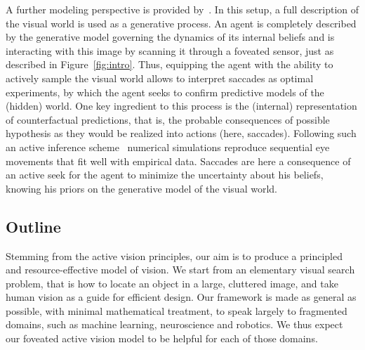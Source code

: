 A further modeling perspective is {\color{red} provided by~\cite{Friston12}}. In this setup, a full description of the visual world is used as a generative process. An agent is completely described by the generative model governing the dynamics of its internal beliefs and is interacting with this image by scanning it through a foveated sensor, just as described in Figure~\ref{fig:intro}. Thus, equipping the agent with the ability to actively sample the visual world %
allows to interpret saccades as optimal experiments, by which the agent seeks to confirm predictive models of the (hidden) world. One key ingredient to this process is the (internal) representation of counterfactual predictions, that is, the probable consequences of possible hypothesis as they would be realized into actions (here, saccades). Following such an active inference scheme~\cite{Mirza18} numerical simulations reproduce sequential eye movements that fit well with empirical data. %
Saccades %
are here a consequence of an active seek for the agent to minimize the uncertainty about his beliefs, knowing his priors on the generative model of the visual world. 

\subsection*{Outline}


Stemming from the active vision principles, our aim is to produce a principled and resource-effective model of vision. 
We start from an elementary visual search problem, that is how to locate an object in a large, cluttered image, and take human vision as a guide for efficient design. Our framework is made as general as possible, with minimal mathematical treatment, to speak largely to fragmented domains, such as machine learning, neuroscience and robotics. We thus expect our foveated active vision model to be helpful for each of those domains. 

